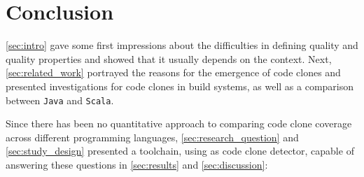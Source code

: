 
\section{Conclusion}
\label{sec:conclusion}

\autoref{sec:intro} gave some first impressions about the difficulties in defining quality and quality properties and showed that it usually depends on the context. Next, \autoref{sec:related_work} portrayed the reasons for the emergence of code clones and presented investigations for code clones in build systems, as well as a comparison between \texttt{Java} and \texttt{Scala}.

Since there has been no quantitative approach to comparing code clone coverage across different programming languages, \autoref{sec:research_question} and \autoref{sec:study_design} presented a toolchain, using \teamscale{} as code clone detector, capable of answering these questions in \autoref{sec:results} and \autoref{sec:discussion}:


